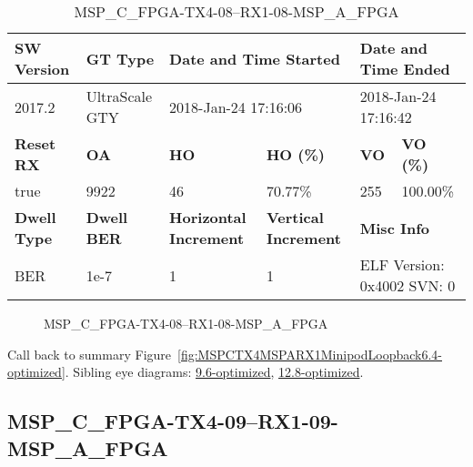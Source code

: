 \begin{table}[h]
\centering
\caption{MSP\_C\_FPGA-TX4-08--RX1-08-MSP\_A\_FPGA}
\label{tab:MSPCFPGATX408RX108MSPAFPGA6.4-optimized}
\begin{tabular}{@{}|l|l|l|l|l|l|@{}}
\toprule
\textbf{SW Version}                & \textbf{GT Type}   & \multicolumn{2}{l|}{\textbf{Date and Time Started}}            & \multicolumn{2}{l|}{\textbf{Date and Time Ended}}        \\ \midrule
2017.2                       & UltraScale GTY          & \multicolumn{2}{l|}{2018-Jan-24 17:16:06}                   & \multicolumn{2}{l|}{2018-Jan-24 17:16:42}               \\ \midrule
\textbf{Reset RX}                  & \textbf{OA} & \textbf{HO}   & \textbf{HO (\%)} & \textbf{VO} & \textbf{VO (\%)} \\ \midrule
true & 9922        & 46          & 70.77\%        & 255        & 100.00\%       \\ \midrule
\textbf{Dwell Type}                & \textbf{Dwell BER} & \textbf{Horizontal Increment} & \textbf{Vertical Increment}    & \multicolumn{2}{l|}{\textbf{Misc Info}}                  \\ \midrule
BER                            & 1e-7        & 1        & 1           & \multicolumn{2}{l|}{ELF Version: 0x4002 SVN: 0}                         \\ \bottomrule
\end{tabular}
\end{table}

\begin{figure}[h]
\caption{MSP\_C\_FPGA-TX4-08--RX1-08-MSP\_A\_FPGA} \label{fig:MSPCFPGATX408RX108MSPAFPGA6.4-optimized}
\end{figure}

Call back to summary Figure~\ref{fig:MSPCTX4MSPARX1MinipodLoopback6.4-optimized}.
Sibling eye diagrams: \hyperref[sec:MSPCFPGATX408RX108MSPAFPGA9.6-optimized]{9.6-optimized}, \hyperref[sec:MSPCFPGATX408RX108MSPAFPGA12.8-optimized]{12.8-optimized}.

\clearpage
\newpage


\subsection{MSP\_C\_FPGA-TX4-09--RX1-09-MSP\_A\_FPGA}\label{sec:MSPCFPGATX409RX109MSPAFPGA6.4-optimized}

